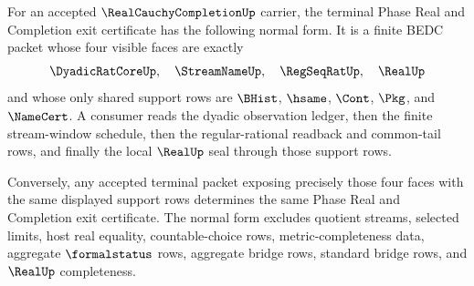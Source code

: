\begin{theorem}
\label{thm:real-cauchy-completion-terminal-exit-normal-form}
For an accepted $\RealCauchyCompletionUp$ carrier, the terminal Phase Real and Completion exit certificate has the following normal form. It is a finite BEDC packet whose four visible faces are exactly
$$
\DyadicRatCoreUp,\quad \StreamNameUp,\quad \RegSeqRatUp,\quad \RealUp
$$
and whose only shared support rows are $\BHist$, $\hsame$, $\Cont$, $\Pkg$, and $\NameCert$. A consumer reads the dyadic observation ledger, then the finite stream-window schedule, then the regular-rational readback and common-tail rows, and finally the local $\RealUp$ seal through those support rows.

Conversely, any accepted terminal packet exposing precisely those four faces with the same displayed support rows determines the same Phase Real and Completion exit certificate. The normal form excludes quotient streams, selected limits, host real equality, countable-choice rows, metric-completeness data, aggregate $\formalstatus$ rows, aggregate bridge rows, standard bridge rows, and $\RealUp$ completeness.
\end{theorem}
